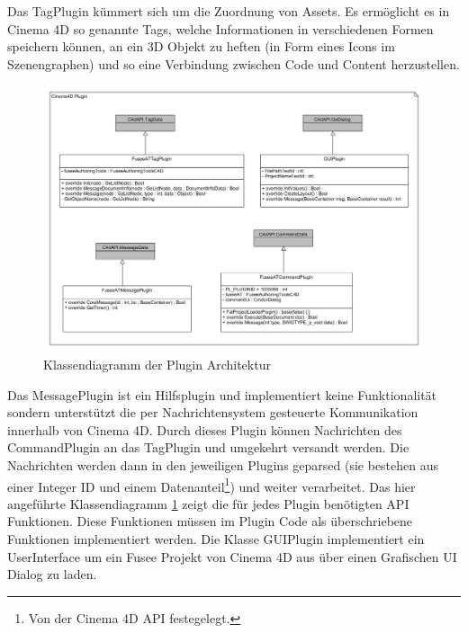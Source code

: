 \documentclass[pagesize, paper=a4, fontsize=12pt, titlepage=true, headings=small, headnosepline, abstractoff, liststotoc, nochapterprefix, plainheadsepline, twoside]{scrreprt}
\begin{document}
Das TagPlugin kümmert sich um die Zuordnung von Assets. Es ermöglicht es in Cinema 4D so genannte Tags, welche Informationen in verschiedenen Formen speichern können, an ein 3D Objekt zu heften (in Form eines Icons im Szenengraphen) und so eine Verbindung zwischen Code und Content herzustellen.
\begin{figure}[ht]
	\centering
	\includegraphics[width=\linewidth]{Bilder/Klassendiagramm_Plugin.jpg}
	\caption{Klassendiagramm der Plugin Architektur}
	\label{KlassendiagrammPluginArchitektur}
\end{figure}
Das MessagePlugin ist ein Hilfsplugin und implementiert keine Funktionalität sondern unterstützt die per Nachrichtensystem gesteuerte Kommunikation innerhalb von Cinema 4D. Durch dieses Plugin können Nachrichten des CommandPlugin an das TagPlugin und umgekehrt versandt werden. Die Nachrichten werden dann in den jeweiligen Plugins geparsed (sie bestehen aus einer Integer ID und einem Datenanteil\footnote{Von der Cinema 4D API festegelegt.}) und weiter verarbeitet. 
Das hier angeführte Klassendiagramm \ref{KlassendiagrammPluginArchitektur} zeigt die für jedes Plugin benötigten API Funktionen. Diese Funktionen müssen im Plugin Code als überschriebene Funktionen implementiert werden. Die Klasse GUIPlugin implementiert ein UserInterface um ein Fusee Projekt von Cinema 4D aus über einen Grafischen UI Dialog zu laden.


\end{document}
